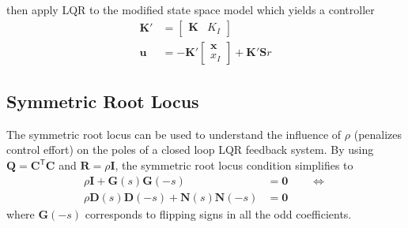 then apply LQR to the modified state space model which yields a controller
\begin{align*}
    \mathbf{K}' & =\begin{bmatrix}
                       \mathbf{K} & K_I
                   \end{bmatrix}                          \\
    \mathbf{u}  & =-\mathbf{K}'\begin{bmatrix}
                                   \mathbf{x} \\
                                   x_I
                               \end{bmatrix} + \mathbf{K'S}r
\end{align*}

\subsection{Symmetric Root Locus}
The symmetric root locus can be used to understand the influence of $\rho$ (penalizes control effort) on the poles of a closed loop LQR feedback system.
By using $\mathbf{Q}=\mathbf{C}^{\mathsf{T}} \mathbf{C}$ and $\mathbf{R}=\rho \mathbf{I}$, the symmetric root locus condition simplifies to
\noindent\begin{align*}
    \rho \mathbf{I}+\mathbf{G}(s)\mathbf{G}(-s)                  & =\mathbf{0} \qquad \Leftrightarrow \\
    \rho \mathbf{D}(s)\mathbf{D}(-s)+\mathbf{N}(s)\mathbf{N}(-s) & =\mathbf{0}
\end{align*}
where $\mathbf{G}(-s)$ corresponds to flipping signs in all the odd coefficients.

\newpar{}

